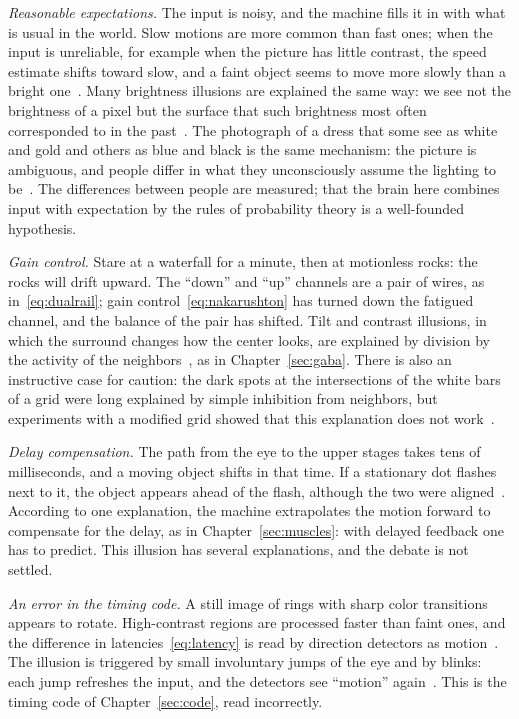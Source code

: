 \emph{Reasonable expectations.} The input is noisy, and the machine fills it in with what is usual in the world. Slow motions are more common than fast ones; when the input is unreliable, for example when the picture has little contrast, the speed estimate shifts toward slow, and a faint object seems to move more slowly than a bright one~\cite{Weiss2002}. Many brightness illusions are explained the same way: we see not the brightness of a pixel but the surface that such brightness most often corresponded to in the past~\cite{Purves2011}. The photograph of a dress that some see as white and gold and others as blue and black is the same mechanism: the picture is ambiguous, and people differ in what they unconsciously assume the lighting to be~\cite{LaferSousa2015,Wallisch2017}. The differences between people are measured; that the brain here combines input with expectation by the rules of probability theory is a well-founded hypothesis.

\emph{Gain control.} Stare at a waterfall for a minute, then at motionless rocks: the rocks will drift upward. The ``down'' and ``up'' channels are a pair of wires, as in~\eqref{eq:dualrail}; gain control~\eqref{eq:nakarushton} has turned down the fatigued channel, and the balance of the pair has shifted. Tilt and contrast illusions, in which the surround changes how the center looks, are explained by division by the activity of the neighbors~\cite{Schwartz2009}, as in Chapter~\ref{sec:gaba}. There is also an instructive case for caution: the dark spots at the intersections of the white bars of a grid were long explained by simple inhibition from neighbors, but experiments with a modified grid showed that this explanation does not work~\cite{SchillerCarvey2005}.

\emph{Delay compensation.} The path from the eye to the upper stages takes tens of milliseconds, and a moving object shifts in that time. If a stationary dot flashes next to it, the object appears ahead of the flash, although the two were aligned~\cite{Nijhawan1994}. According to one explanation, the machine extrapolates the motion forward to compensate for the delay, as in Chapter~\ref{sec:muscles}: with delayed feedback one has to predict. This illusion has several explanations, and the debate is not settled.

\emph{An error in the timing code.} A still image of rings with sharp color transitions appears to rotate. High-contrast regions are processed faster than faint ones, and the difference in latencies~\eqref{eq:latency} is read by direction detectors as motion~\cite{Conway2005}. The illusion is triggered by small involuntary jumps of the eye and by blinks: each jump refreshes the input, and the detectors see ``motion'' again~\cite{OteroMillan2012}. This is the timing code of Chapter~\ref{sec:code}, read incorrectly.

